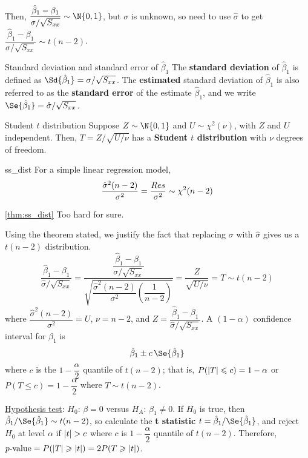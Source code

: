 Then, $ \dfrac{\hat{\beta}_1-\beta_1}{\sigma/\sqrt{S_{xx}}} \sim \N{0,1} $,
but $ \sigma $ is unknown, so need to use $ \hat{\sigma} $
to get
$ \dfrac{\hat{\beta}_1-\beta_1}{\hat{\sigma}/\sqrt{S_{xx}}}
    \sim t(n-2) $.
\begin{Definition}{Standard deviation and standard error of $ \hat{\beta}_1 $}{}
    The \textbf{standard deviation} of $ \hat{\beta}_1 $
    is defined as $ \Sd{\hat{\beta}_1}=\sigma/\sqrt{S_{xx}} $.
    The \textbf{estimated} standard deviation of $ \hat{\beta}_1 $
    is also referred to as the \textbf{standard error}
    of the estimate $ \hat{\beta}_1 $, and
    we write $ \Se{\hat{\beta}_1}=\hat{\sigma}/\sqrt{S_{xx}} $.
\end{Definition}
\begin{Definition}{Student $ t $ distribution}{}
    Suppose $ Z \sim \N{0,1} $
    and $ U \sim \chi^2(\nu) $,
    with $ Z $ and $ U $ independent. Then,
    $ T=Z/\sqrt{U/\nu} $ has a \textbf{Student $t$ distribution}
    with $ \nu $ degrees of freedom.
\end{Definition}
\begin{Theorem}{}{ss_dist}
    For a simple linear regression model,
    \[ \frac{\hat{\sigma}^2(n-2)}{\sigma^2}=\frac{\relax{Res}}{\sigma^2}
        \sim \chi^2(n-2) \]
\end{Theorem}
\begin{Proof}{\ref{thm:ss_dist}}{}
    Too hard for sure.
\end{Proof}
Using the theorem stated, we justify
the fact that replacing $ \sigma $ with $ \hat{\sigma} $
gives us a $ t(n-2) $ distribution.
\[ \frac{\hat{\beta}_1-\beta_1}{\hat{\sigma}/\sqrt{S_{xx}}}
    =\dfrac{\dfrac{\hat{\beta}_1-\beta_1}{\sigma/\sqrt{S_{xx}}}}{
        \sqrt{\dfrac{\hat{\sigma}^2(n-2)}{\sigma^2}\left( \dfrac{1}{n-2} \right)}
    }=
    \frac{Z}{\sqrt{U/\nu}}=T \sim t(n-2)  \]
where $ \dfrac{\hat{\sigma}^2(n-2)}{\sigma^2}=U $,
$ \nu=n-2 $, and $ Z=\dfrac{\hat{\beta}_1-\beta_1}{\hat{\sigma}/\sqrt{S_{xx}}} $.
A $ (1-\alpha) $ confidence interval for $ \beta_1 $ is
\[ \hat{\beta}_1\pm c\,\Se{\hat{\beta}_1} \]
where $ c $ is the $ 1-\dfrac{\alpha}{2} $ quantile
of $ t(n-2) $; that is,
$ P(\lvert T\rvert\leqslant c)=1-\alpha $ or
$ P(T\leqslant c)=1-\dfrac{\alpha}{2} $
where $ T \sim t(n-2) $.

\underline{Hypothesis test}:
$ H_0 $: $ \beta=0 $ versus
$ H_A $: $ \beta_1\neq 0 $.
If $ H_0 $ is true, then $ \hat{\beta}_1/\Se{\hat{\beta}_1} \sim t(n-2) $,
so calculate the \textbf{t statistic}
$ t=\hat{\beta}_1/\Se{\hat{\beta}_1} $,
and reject $ H_0 $ at level $ \alpha $ if $ \lvert t\rvert>c $
where $ c $ is $ 1-\dfrac{\alpha}{2} $ quantile of $ t(n-2) $.
Therefore,
$ p\text{-value}=P(\lvert T\rvert\geqslant \lvert t\rvert)
    =2P(T\geqslant \lvert t\rvert) $.
